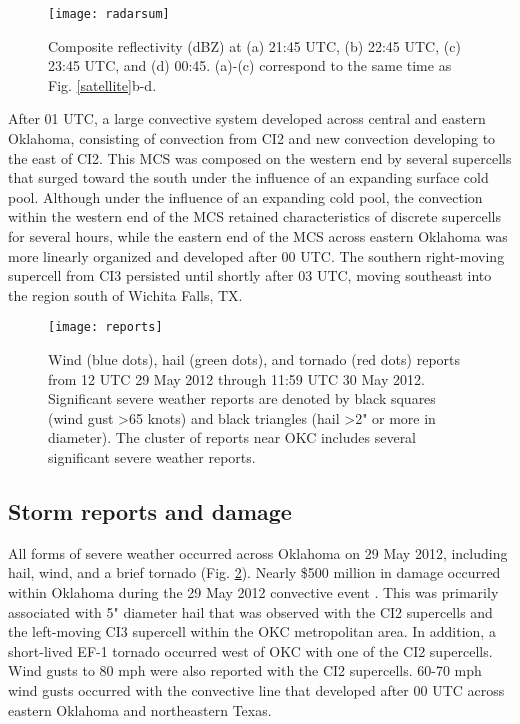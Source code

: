 \begin{figure}
\centering
\texttt{[image: radarsum]}
\caption{Composite reflectivity (dBZ) at (a) 21:45 UTC, (b) 22:45 UTC, (c) 23:45 UTC, and (d) 00:45. (a)-(c) correspond to the same time as Fig. \ref{satellite}b-d.}
\label{radarsummary}
\end{figure}

After 01 UTC, a large convective system developed across central and eastern Oklahoma, consisting of convection from CI2 and new convection developing to the east of CI2. This MCS was composed on the western end by several supercells that surged toward the south under the influence of an expanding surface cold pool. Although under the influence of an expanding cold pool, the convection within the western end of the MCS retained characteristics of discrete supercells for several hours, while the eastern end of the MCS across eastern Oklahoma was more linearly organized and developed after 00 UTC. The southern right-moving supercell from CI3 persisted until shortly after 03 UTC, moving southeast into the region south of Wichita Falls, TX.

\begin{figure}
\centering
\texttt{[image: reports]}
\caption{Wind (blue dots), hail (green dots), and tornado (red dots) reports from 12 UTC 29 May 2012 through 11:59 UTC 30 May 2012. Significant severe weather reports are denoted by black squares (wind gust \textgreater 65 knots) and black triangles (hail \textgreater 2" or more in diameter). The cluster of reports near OKC includes several significant severe weather reports. }
\label{reports}
\end{figure}

\subsection{Storm reports and damage}
All forms of severe weather occurred across Oklahoma on 29 May 2012, including hail, wind, and a brief tornado (Fig. \ref{reports}). Nearly \$500 million in damage occurred within Oklahoma during the 29 May 2012 convective event \citep{ncdc12}. This was primarily associated with 5" diameter hail that was observed with the CI2 supercells and the left-moving CI3 supercell within the OKC metropolitan area. In addition, a short-lived EF-1 tornado occurred west of OKC with one of the CI2 supercells. Wind gusts to 80 mph were also reported with the CI2 supercells. 60-70 mph wind gusts occurred with the convective line that developed after 00 UTC across eastern Oklahoma and northeastern Texas.

